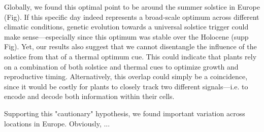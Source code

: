 \documentclass[11pt,letter]{article}
\begin{document}
Globally, we found this optimal point to be around the summer solstice in Europe (Fig). If this specific day indeed represents a broad-scale optimum across different climatic conditions, genetic evolution towards a universal solstice trigger could make sense---especially since this optimum was stable over the Holocene (supp Fig). Yet, our results also suggest that we cannot disentangle the influence of the solstice from that of a thermal optimum cue. This could indicate that plants rely on a combination of both solstice and thermal cues to optimize growth and reproductive timing. Alternatively, this overlap could simply be a coincidence, since it would be costly for plants to closely track two different signals---i.e. to encode and decode both information within their cells. 

Supporting this "cautionary" hypothesis, we found important variation across locations in Europe. Obviously, ...



\end{document}

